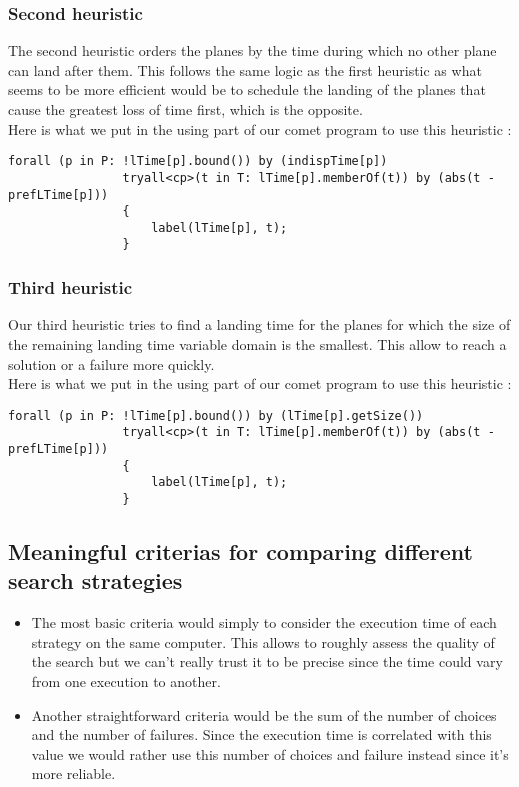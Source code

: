 \documentclass{eplDoc}
\begin{document}
\subsubsection{Second heuristic}
The second heuristic orders the planes by the time during which no other plane can land after them. This follows the same logic as the first heuristic as what seems to be more efficient would be to schedule the landing of the planes that cause the greatest loss of time first, which is the opposite. \\ 
Here is what we put in the using part of our comet program to use this heuristic : 
\begin{lstlisting}
forall (p in P: !lTime[p].bound()) by (indispTime[p])
                tryall<cp>(t in T: lTime[p].memberOf(t)) by (abs(t - prefLTime[p]))
                {
                    label(lTime[p], t);
                } 
\end{lstlisting}
\subsubsection{Third heuristic}
Our third heuristic tries to find a landing time for the planes for which the size of the remaining landing time variable domain is the smallest. This allow to reach a solution or a failure more quickly. \\ 
Here is what we put in the using part of our comet program to use this heuristic : 
\begin{lstlisting}
forall (p in P: !lTime[p].bound()) by (lTime[p].getSize())
                tryall<cp>(t in T: lTime[p].memberOf(t)) by (abs(t - prefLTime[p]))
                {
                    label(lTime[p], t);
                } 
\end{lstlisting}

\subsection{Meaningful criterias for comparing different search strategies}

\begin{itemize}
	\item The most basic criteria would simply to consider the execution time of each strategy on the same computer. This allows to roughly assess the quality of the search but we can't really trust it to be precise since the time could vary from one execution to another. 
	\item Another straightforward criteria would be the sum of the number of choices and the number of failures. Since the execution time is correlated with this value we would rather use this number of choices and failure instead since it's more reliable. 
	
\end{itemize}
\end{document}
